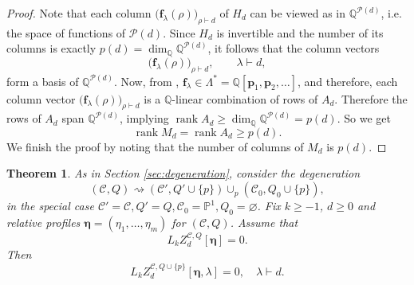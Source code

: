 \documentclass[letterpaper,12pt]{amsart}
\newtheorem{thm}{Theorem}[section]
\theoremstyle{definition}
\newcommand{\Q}{\mathbb Q}
\newcommand{\cC}{\mathcal C}
\newcommand{\rank}{\operatorname{rank}}
\numberwithin{equation}{section}
\begin{document}
\begin{proof}
Note that each column $\bigl(\mathbf f_\lambda(\rho)\bigr)_{\rho\vdash d}$ of $H_d$ can be viewed as in $\mathbb Q^{\mathcal P(d)}$, i.e. the space of functions of $\mathcal P(d)$. Since $H_d$ is invertible and the number of its columns is exactly $p(d)=\dim_\mathbb Q\mathbb Q^{\mathcal P(d)}$, it follows that the column vectors
\[
\bigl(\mathbf f_\lambda(\rho)\bigr)_{\rho\vdash d},
\qquad
\lambda\vdash d,
\]
form a basis of \(\mathbb Q^{\mathcal P(d)}\). Now, from \cite[\S0.4]{OP1}, \(\mathbf f_\lambda\in
\Lambda^*
=
\mathbb Q[\mathbf p_1,\mathbf p_2,\ldots]
\), and therefore, each column vector
\(
\bigl(\mathbf f_\lambda(\rho)\bigr)_{\rho\vdash d}
\)
is a $\Q$-linear combination of rows of \(A_d\). Therefore the rows of \(A_d\) span
\(\mathbb Q^{\mathcal P(d)}\), implying $\rank A_d\ge\dim_\mathbb Q\mathbb Q^{\mathcal P(d)}=p(d)$. So we get
\[
\rank M_d=\rank A_d\ge p(d).
\]
We finish the proof by noting that the number of columns of $M_d$ is $p(d)$. \end{proof}






\begin{thm}
\label{thm:cap-inversion}
 As in Section \ref{sec:degeneration}, consider the degeneration
\[
(\mathcal C,Q)
\rightsquigarrow
(\mathcal C',Q'\cup\{p\})
\cup_p
(\mathcal C_0,Q_0\cup\{p\}),
\]
in the special case $\mathcal C'=\mathcal C,Q'=Q,\mathcal C_0=\mathbb P^1,Q_0=\varnothing$. 
Fix $k\ge-1$, \(d\geq0\) and relative profiles
\(\boldsymbol{\eta}=(\eta_1,\dots,\eta_m)\) for $(\mathcal C,Q)$. 
Assume that
\[
L_{k}Z^{\cC,Q}_d[\boldsymbol\eta]=0.
\]
Then
\[
L_{k}Z^{\cC,Q\cup\{p\}}_d[\boldsymbol\eta,\lambda]=0,\quad \lambda\vdash d.
\]
\end{thm}
\end{document}
